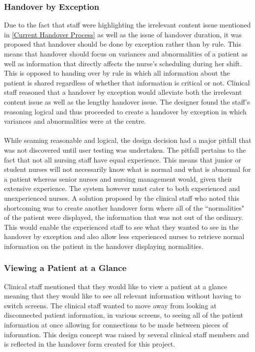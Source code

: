 \subsubsection{Handover by Exception}
Due to the fact that staff were highlighting the irrelevant content issue mentioned in \ref{Current Handover Process} as well as the issue of handover duration, it was proposed that handover should be done by exception rather than by rule. This means that handover should focus on variances and abnormalities of a patient as well as information that directly affects the nurse's scheduling during her shift. This is opposed to handing over by rule in which all information about the patient is shared regardless of whether that information is critical or not. Clinical staff reasoned that a handover by exception would alleviate both the irrelevant content issue as well as the lengthy handover issue. The designer found the staff's reasoning logical and thus proceeded to create a handover by exception in which variances and abnormalities were at the centre.
\\ \\
While seaming reasonable and logical, the design decision had a major pitfall that was not discovered until user testing was undertaken. The pitfall pertains to the fact that not all nursing staff have equal experience. This means that junior or student nurses will not necessarily know what is normal and what is abnormal for a patient whereas senior nurses and nursing management would, given their extensive experience. The system however must cater to both experienced and unexperienced nurses. A solution proposed by the clinical staff who noted this shortcoming was to create another handover form where all of the ``normalities" of the patient were displayed, the information that was not out of the ordinary. This would enable the experienced staff to see what they wanted to see in the handover by exception and also allow less experienced nurses to retrieve normal information on the patient in the handover displaying normalities. 

\subsubsection{Viewing a Patient at a Glance}
Clinical staff mentioned that they would like to view a patient at a glance meaning that they would like to see all relevant information without having to switch screens. The clinical staff wanted to move away from looking at disconnected patient information, in various screens, to seeing all of the patient information at once allowing for connections to be made between pieces of information. This design concept was raised by several clinical staff members and is reflected in the handover form created for this project. 

